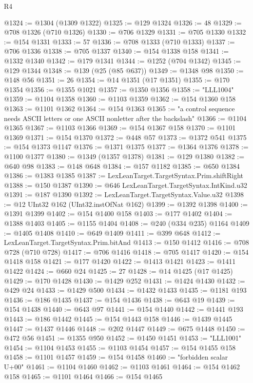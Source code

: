 \begin{lexlean}{R4}
\begin{coremodule}
@1324 := @1304 (@1309 @1322)
@1325 := @129 @1324
@1326 := 48
@1329 := @708 @1326 (@710 @1326)
@1330 := @706 @1329
@1331 := @705 @1330
@1332 := @154 @1331
@1333 := 57
@1336 := @708 @1333 (@710 @1333)
@1337 := @706 @1336
@1338 := @705 @1337
@1340 := @154 @1338 @158
@1341 := @1332 @1340
@1342 := @179 @1341
@1344 := @1252 (@704 @1342)
@1345 := @129 @1344
@1348 := @139 (@25 (@85 @637))
@1349 := @1348 @98
@1350 := @148 @56
@1351 := 26
@1354 := @14 @1351 (@17 @1351)
@1355 := @170 @1354
@1356 := @1355 @1021
@1357 := @1350 @1356
@1358 := "LLL1004"
@1359 := @1104 @1358
@1360 := @1103 @1359
@1362 := @154 @1360 @158
@1363 := @1101 @1362
@1364 := @154 @1363
@1365 := "a control sequence needs ASCII letters or one ASCII nonletter after the backslash"
@1366 := @1104 @1365
@1367 := @1103 @1366
@1369 := @154 @1367 @158
@1370 := @1101 @1369
@1371 := @154 @1370
@1372 := @448 @57
@1373 := @1372 @541
@1375 := @154 @1373 @1147
@1376 := @1371 @1375
@1377 := @1364 @1376
@1378 := @1100 @1377
@1380 := @1349 (@1357 @1378)
@1381 := @129 @1380
@1382 := @640 @98
@1383 := @148 @648
@1384 := @157 @1182
@1385 := @650 @1384
@1386 := @1383 @1385
@1387 := LexLeanTarget.TargetSyntax.Prim.shiftRight
@1388 := @150 @1387
@1390 := @646 LexLeanTarget.TargetSyntax.IntKind.u32
@1391 := @187 @1390
@1392 := LexLeanTarget.TargetSyntax.Value.u32
@1398 := @12 UInt32 @162 (UInt32.instOfNat @162)
@1399 := @1392 @1398
@1400 := @1391 @1399
@1402 := @154 @1400 @158
@1403 := @177 @1402
@1404 := @1388 @1403
@1405 := @1155 @1404
@1408 := @240 (@334 @235) @1164
@1409 := @1405 @1408
@1410 := @649 @1409
@1411 := @399 @648
@1412 := LexLeanTarget.TargetSyntax.Prim.bitAnd
@1413 := @150 @1412
@1416 := @708 @728 (@710 @728)
@1417 := @706 @1416
@1418 := @705 @1417
@1420 := @154 @1418 @158
@1421 := @177 @1420
@1422 := @1413 @1421
@1423 := @1411 @1422
@1424 := @660 @24
@1425 := 27
@1428 := @14 @1425 (@17 @1425)
@1429 := @170 @1428
@1430 := @1429 @252
@1431 := @1424 @1430
@1432 := @429 @24
@1433 := @1429 @500
@1434 := @1432 @1433
@1435 := @1181 @193
@1436 := @186 @1435
@1437 := @154 @1436
@1438 := @643 @19
@1439 := @154 @1438
@1440 := @643 @97
@1441 := @154 @1440
@1442 := @1441 @193
@1443 := @186 @1442
@1445 := @154 @1443 @158
@1446 := @1439 @1445
@1447 := @1437 @1446
@1448 := @202 @1447
@1449 := @675 @1448
@1450 := @472 @56
@1451 := @1355 @950
@1452 := @1450 @1451
@1453 := "LLL1001"
@1454 := @1104 @1453
@1455 := @1103 @1454
@1457 := @154 @1455 @158
@1458 := @1101 @1457
@1459 := @154 @1458
@1460 := "forbidden scalar U+00"
@1461 := @1104 @1460
@1462 := @1103 @1461
@1464 := @154 @1462 @158
@1465 := @1101 @1464
@1466 := @154 @1465

\end{coremodule}
\end{lexlean}
